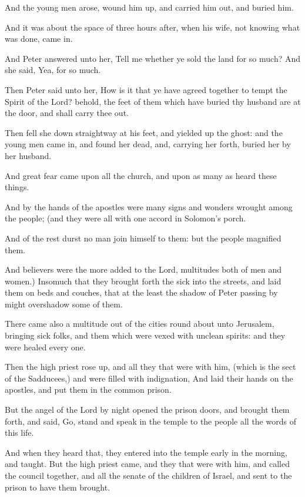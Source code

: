 \Verse And the young men arose, wound him up, and carried him out, and buried him.

\Verse And it was about the space of three hours after, when his wife, not knowing what was done, came in.

\Verse And Peter answered unto her, Tell me whether ye sold the land for so much? And she said, Yea, for so much.

\Verse Then Peter said unto her, How is it that ye have agreed together to tempt the Spirit of the Lord? behold, the feet of them which have buried thy husband are at the door, and shall carry thee out.

\Verse Then fell she down straightway at his feet, and yielded up the ghost: and the young men came in, and found her dead, and, carrying her forth, buried her by her husband.

\Verse And great fear came upon all the church, and upon as many as heard these things.

\Verse And by the hands of the apostles were many signs and wonders wrought among the people; (and they were all with one accord in Solomon's porch.

\Verse And of the rest durst no man join himself to them: but the people magnified them.

\Verse And believers were the more added to the Lord, multitudes both of men and women.)  \Verse Insomuch that they brought forth the sick into the streets, and laid them on beds and couches, that at the least the shadow of Peter passing by might overshadow some of them.

\Verse There came also a multitude out of the cities round about unto Jerusalem, bringing sick folks, and them which were vexed with unclean spirits: and they were healed every one.

\Verse Then the high priest rose up, and all they that were with him, (which is the sect of the Sadducees,) and were filled with indignation, \Verse And laid their hands on the apostles, and put them in the common prison.

\Verse But the angel of the Lord by night opened the prison doors, and brought them forth, and said, \Verse Go, stand and speak in the temple to the people all the words of this life.

\Verse And when they heard that, they entered into the temple early in the morning, and taught. But the high priest came, and they that were with him, and called the council together, and all the senate of the children of Israel, and sent to the prison to have them brought.

